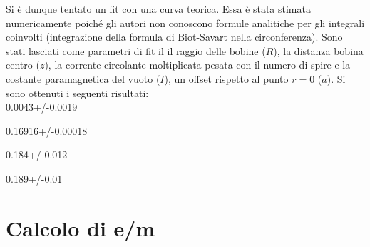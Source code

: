 \documentclass[10pt,a4paper]{article}
\begin{document}
Si è dunque tentato un fit con una curva teorica. Essa è stata stimata numericamente poiché gli autori non conoscono formule analitiche per gli integrali coinvolti (integrazione della formula di Biot-Savart nella circonferenza). Sono stati lasciati come parametri di fit il il raggio delle bobine ($R$), la distanza bobina centro ($z$), la corrente circolante moltiplicata pesata con il numero di spire e la costante paramagnetica del vuoto ($I$), un offset rispetto al punto $r=0$ ($a$). Si sono ottenuti i seguenti risultati:\\

0.0043+/-0.0019

0.16916+/-0.00018

0.184+/-0.012

0.189+/-0.01

\section{Calcolo di e/m}


\end{document}
